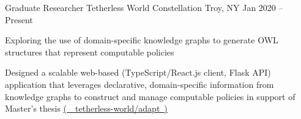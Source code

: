 
\begin{cventries}

  \cventry
  {Graduate Researcher}
  {Tetherless World Constellation}
  {Troy, NY}
  {Jan 2020 -- Present}
  {
    \begin{cvitems}
      \item {
                  Exploring the use of domain-specific knowledge graphs to generate OWL structures that represent computable policies
            }
      \item {
                  Designed a scalable web-based (TypeScript/React.js client, Flask API) application that leverages declarative, domain-specific information from knowledge graphs to construct and manage computable policies in support of Master's thesis \href{
                    https://github.com/tetherless-world/adapt
                  }{
                    (\ \faGithubSquare\ tetherless-world/adapt\ )
                  }
            }
    \end{cvitems}
  }
\end{cventries}